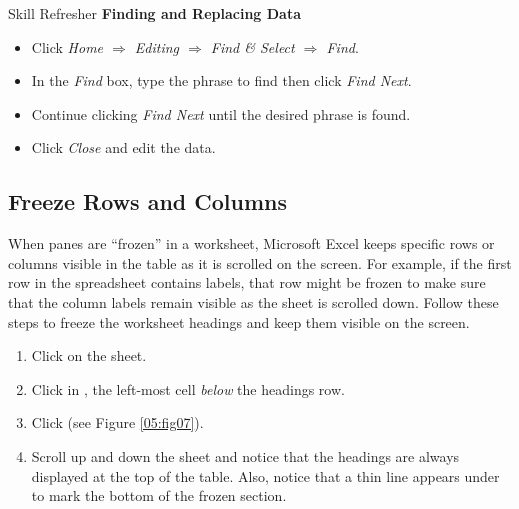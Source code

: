 \begin{center}
	\begin{sklbox}{Skill Refresher}
		\textbf{Finding and Replacing Data}
		\\
		\begin{itemize}
			\setlength{\itemsep}{0pt}
			\setlength{\parskip}{0pt}
			\setlength{\parsep}{0pt}

			\item Click \textit{Home $ \Rightarrow $ Editing $ \Rightarrow $ Find \& Select $ \Rightarrow $ Find}.
			\item In the \textit{Find} box, type the phrase to find then click \textit{Find Next}.
			\item Continue clicking \textit{Find Next} until the desired phrase is found.
			\item Click \textit{Close} and edit the data.
			
		\end{itemize}
	\end{sklbox}
\end{center}

\subsection{Freeze Rows and Columns}

When panes are ``frozen'' in a worksheet, Microsoft Excel keeps specific rows or columns visible in the table as it is scrolled on the screen. For example, if the first row in the spreadsheet contains labels, that row might be frozen to make sure that the column labels remain visible as the sheet is scrolled down. Follow these steps to freeze the worksheet headings and keep them visible on the screen.

\begin{enumerate}
	\item Click on the  sheet.
	\item Click in , the left-most cell \textit{below} the headings row.
	\item Click  (see Figure \ref{05:fig07}).
	\item Scroll up and down the sheet and notice that the headings are always displayed at the top of the table. Also, notice that a thin line appears under  to mark the bottom of the frozen section.
\end{enumerate}

